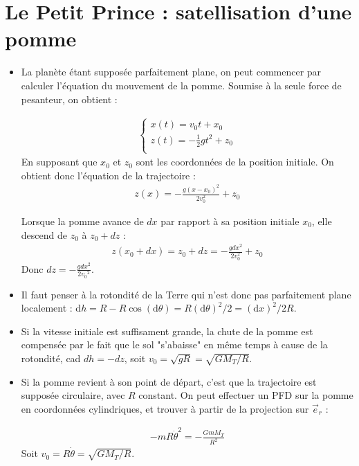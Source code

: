 \documentclass{report}
\begin{document}
\section*{Le Petit Prince : satellisation d'une pomme}

\begin{itemize}
\item La planète étant supposée parfaitement plane, on peut commencer par calculer l'équation du mouvement de la pomme. Soumise à la seule force de pesanteur, on obtient :

\begin{align*}
	\left\lbrace
\begin{array}{ccc}
 x(t) =  v_0t+x_0 \\
 z(t) = -\frac{1}{2}gt^2+z_0 \\
\end{array}\right.
\end{align*}
En supposant que $x_0$ et $z_0$ sont les coordonnées de la position initiale. On obtient donc l'équation de la trajectoire :
\begin{align*}
	z(x) = -\frac{g(x-x_0)^2}{2v_0^2}+z_0
\end{align*}

Lorsque la pomme avance de $dx$ par rapport à sa position initiale $x_0$, elle descend de $z_0$ à $z_0+dz$ :
\begin{align*}
	z(x_0+dx)=z_0+dz=-\frac{gdx^2}{2v_0^2}+z_0
\end{align*}
Donc $dz=-\frac{gdx^2}{2{v_0}^2}$.

\item Il faut penser à la rotondité de la Terre qui n'est donc pas parfaitement plane localement : d$h=R-R\cos(\mathrm{d}\theta)=R(\mathrm{d}\theta)^2/2=(\mathrm{d}x)^2/2R$.

\item Si la vitesse initiale est suffisament grande, la chute de la pomme est compensée par le fait que le sol "s'abaisse" en même temps à cause de la rotondité, cad $dh=-dz$, soit $v_0=\sqrt{gR}=\sqrt{GM_T/R}$.

\item Si la pomme revient à son point de départ, c'est que la trajectoire est supposée circulaire, avec $R$ constant. On peut effectuer un PFD sur la pomme en coordonnées cylindriques, et trouver à partir de la projection sur $\vec{e}_r$ :

\begin{align*}
 -mR\dot{\theta}^2 =  -\frac{GmM_T}{R^2} 
\end{align*}
Soit $v_0=R\dot{\theta}=\sqrt{GM_T/R}$.
\end{itemize}
\end{document}
